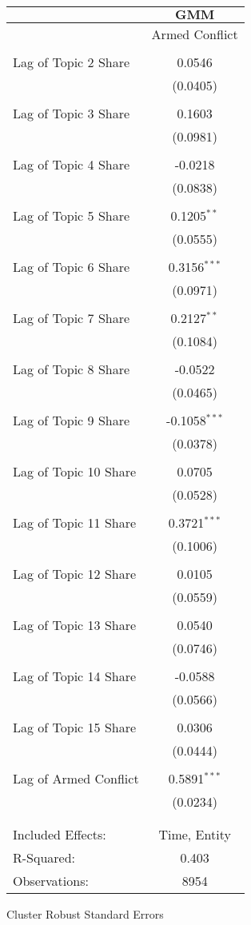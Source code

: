 \begin{center}
\begin{tabular}{lc}
\\[-1.8ex]\hline
& $\textbf{GMM}$\\
 \hline \hline 
& \multicolumn{1}{c}{Armed Conflict} \\
\hline \\[-1.8ex]
Lag of Topic 2 Share & 0.0546 \\
 & (0.0405)\\ 
\\Lag of Topic 3 Share & 0.1603 \\
 & (0.0981)\\ 
\\Lag of Topic 4 Share & -0.0218 \\
 & (0.0838)\\ 
\\Lag of Topic 5 Share & 0.1205$^{**}$ \\
 & (0.0555)\\ 
\\Lag of Topic 6 Share & 0.3156$^{***}$ \\
 & (0.0971)\\ 
\\Lag of Topic 7 Share & 0.2127$^{**}$ \\
 & (0.1084)\\ 
\\Lag of Topic 8 Share & -0.0522 \\
 & (0.0465)\\ 
\\Lag of Topic 9 Share & -0.1058$^{***}$ \\
 & (0.0378)\\ 
\\Lag of Topic 10 Share & 0.0705 \\
 & (0.0528)\\ 
\\Lag of Topic 11 Share & 0.3721$^{***}$ \\
 & (0.1006)\\ 
\\Lag of Topic 12 Share & 0.0105 \\
 & (0.0559)\\ 
\\Lag of Topic 13 Share & 0.0540 \\
 & (0.0746)\\ 
\\Lag of Topic 14 Share & -0.0588 \\
 & (0.0566)\\ 
\\Lag of Topic 15 Share & 0.0306 \\
 & (0.0444)\\ 
\\Lag of Armed Conflict & 0.5891$^{***}$ \\
 & (0.0234)\\ 
\hline \\[-1.8ex]
 \\ Included Effects:  & Time, Entity\\ R-Squared:  & 0.403\\ Observations:  & 8954\end{tabular}
\end{center}Cluster Robust Standard Errors